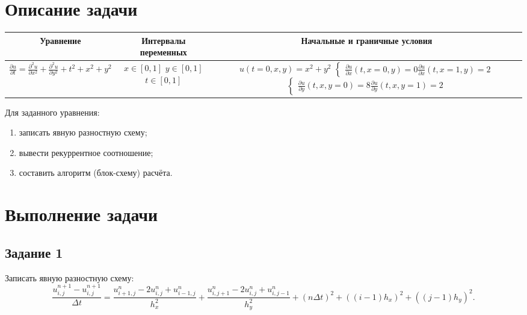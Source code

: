\documentclass[12pt, a4paper]{report}
\begin{document}
	\section*{Описание задачи}
	\large
	\begin{center}
		\begin{tabular}{||c|c|c||}
			\hline
			Уравнение & \makecell{Интервалы \\ переменных} & Начальные и граничные условия \\

			\hline
			$ \frac{\partial u}{\partial t} = \frac{\partial^{2} u}{\partial x^{2}} + \frac{\partial^{2} u}{\partial y^{2}} + t^{2} + x^{2} + y^{2} $ & \makecell{$ x \in [0, 1] $ \\ $ y \in [0, 1] $ \\ $ t \in [0, 1] $} & \makecell{$ u(t = 0, x, y) = x^{2} + y^{2} $ \\ $\begin{cases} \frac{\partial u}{\partial x}(t, x = 0, y) = 0 \\ \frac{\partial u}{\partial x}(t, x = 1, y) = 2 \end{cases}$ \\ $\begin{cases} \frac{\partial u}{\partial y}(t, x, y = 0) = 8 \\ \frac{\partial u}{\partial y}(t, x, y = 1) = 2 \end{cases}$} \\

			\hline
		\end{tabular}
	\end{center}
	\par
	Для заданного уравнения:
	\begin{enumerate}
		\item записать явную разностную схему;
		\item вывести рекуррентное соотношение;
		\item составить алгоритм (блок-схему) расчёта.
	\end{enumerate}

	\newpage

	\section*{Выполнение задачи}

	\subsection*{Задание 1}
	\large
	Записать явную разностную схему:
	\small
	\begin{equation}\label{eq:explicit}
		\frac{u_{i, j}^{n+1} - u_{i, j}^{n+1}}{\Delta t} = \frac{u_{i+1, j}^{n} - 2u_{i, j}^{n} + u_{i-1, j}^{n}}{h_{x}^{2}} + \frac{u_{i, j+1}^{n} - 2u_{i, j}^{n} + u_{i, j-1}^{n}}{h_{y}^{2}} + (n \Delta t)^{2} + ((i - 1)h_{x})^{2} + ((j - 1)h_{y})^{2}.
	\end{equation}
\end{document}
